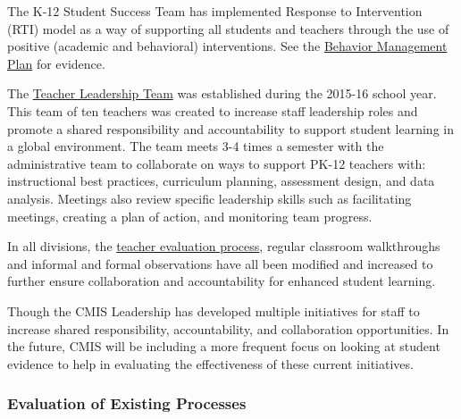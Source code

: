\begin{findings}
The K-12 Student Success Team has implemented Response to Intervention (RTI) model as a way of supporting all students and teachers through the use of positive (academic and behavioral) interventions. See the \href{https://docs.google.com/document/d/16bGCvdQuhHquFdigvip3H5YgfubNVMStl7UpOfCRcFk/edit}{Behavior Management Plan} for evidence. 

The \href{https://docs.google.com/a/cmis.ac.th/document/d/1iW_tWIwRlWU2p0oIOvd3usDsxj9qYDt_2ROwNPBTHSc/edit?usp=sharing}{Teacher Leadership Team} was established during the 2015-16 school year. This team of ten teachers was created to increase staff leadership roles and promote a shared responsibility and accountability to support student learning in a global environment. The team meets 3-4 times a semester with the administrative team to collaborate on ways to support PK-12 teachers with: instructional best practices, curriculum planning, assessment design, and data analysis. Meetings also review specific leadership skills such as facilitating meetings, creating a plan of action, and monitoring team progress.

In all divisions, the \href{https://docs.google.com/document/d/15_5X5QtixmWVheEUBVO9N1aislsLDm_ZW4-4g4YQ7F4/edit?ts=589d25d9}{teacher evaluation process}, regular classroom walkthroughs and informal and formal observations have all been modified and increased to further ensure collaboration and accountability for enhanced student learning.


Though the CMIS Leadership has developed multiple  initiatives for staff to increase shared responsibility, accountability, and collaboration opportunities.  In the future, CMIS will be including a more frequent focus on looking at student evidence to help in evaluating the effectiveness of these current initiatives. 
\end{findings}

\subsubsection{Evaluation of Existing Processes}



